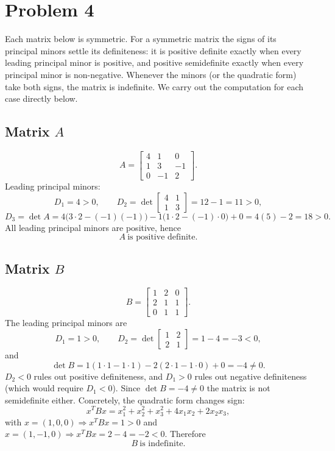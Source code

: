 \documentclass[UTF8,a4paper,12pt]{ctexart}
\begin{document}
\section*{Problem 4}

Each matrix below is symmetric. For a symmetric matrix the signs of its
principal minors settle its definiteness: it is positive definite exactly when
every leading principal minor is positive, and positive semidefinite exactly
when every principal minor is non-negative. Whenever the minors (or the
quadratic form) take both signs, the matrix is indefinite. We carry out the
computation for each case directly below.

\subsection*{Matrix $A$}
\[
A=\begin{bmatrix}
4 & 1 & 0\\
1 & 3 & -1\\
0 & -1 & 2
\end{bmatrix}.
\]
Leading principal minors:
\[
D_1=4>0,\qquad
D_2=\det\begin{bmatrix}4&1\\1&3\end{bmatrix}=12-1=11>0,
\]
\[
D_3=\det A
=4\bigl(3\cdot2-(-1)(-1)\bigr)-1\bigl(1\cdot2-(-1)\cdot0\bigr)+0
=4(5)-2=18>0 .
\]
All leading principal minors are positive, hence
\[
\boxed{A\ \text{is positive definite.}}
\]

\subsection*{Matrix $B$}
\[
B=\begin{bmatrix}
1 & 2 & 0\\
2 & 1 & 1\\
0 & 1 & 1
\end{bmatrix}.
\]
The leading principal minors are
\[
D_1=1>0,\qquad
D_2=\det\begin{bmatrix}1&2\\2&1\end{bmatrix}=1-4=-3<0,
\]
and
\[
\det B=1(1\cdot1-1\cdot1)-2(2\cdot1-1\cdot0)+0=-4\neq0 .
\]
$D_2<0$ rules out positive definiteness, and $D_1>0$ rules out negative
definiteness (which would require $D_1<0$). Since $\det B=-4\neq0$ the matrix is
not semidefinite either. Concretely, the quadratic form changes sign:
\[
x^TBx=x_1^2+x_2^2+x_3^2+4x_1x_2+2x_2x_3,
\]
with $x=(1,0,0)\Rightarrow x^TBx=1>0$ and
$x=(1,-1,0)\Rightarrow x^TBx=2-4=-2<0$. Therefore
\[
\boxed{B\ \text{is indefinite.}}
\]
\end{document}
